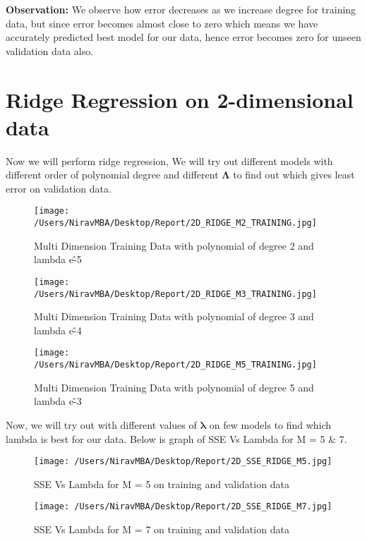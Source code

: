 \documentclass[12pt]{report}
\begin{document}
{\bfseries Observation: } 
We observe how error decreases as we increase degree for training data, but since error becomes almost close to zero which means we have accurately predicted best model for our data, hence error becomes zero for unseen validation data also.



\cleardoublepage

\section{Ridge Regression on 2-dimensional data}


Now we will perform ridge regression, We will try out different models with different order of polynomial degree and different  $ \mathbf{\Lambda} $ to find out which gives least error on validation data.

\begin{figure}[H]
	\centering
	\texttt{[image: /Users/NiravMBA/Desktop/Report/2D\_RIDGE\_M2\_TRAINING.jpg]}
	\caption{Multi Dimension Training Data with polynomial of degree 2 and lambda e\^-5} 
\end{figure}

\begin{figure}[H]
	\centering
	\texttt{[image: /Users/NiravMBA/Desktop/Report/2D\_RIDGE\_M3\_TRAINING.jpg]}
	\caption{Multi Dimension Training Data with polynomial of degree 3 and lambda e\^-4} 
\end{figure}

\begin{figure}[H]
	\centering
	\texttt{[image: /Users/NiravMBA/Desktop/Report/2D\_RIDGE\_M5\_TRAINING.jpg]}
	\caption{Multi Dimension Training Data with polynomial of degree 5 and lambda e\^-3} 
\end{figure}

Now, we will try out with different values of $ \mathbf{\lambda} $ on few models to find which lambda is best for our data. Below is graph of SSE Vs Lambda for M = 5 \& 7.\\

\begin{figure}[H]
	\centering
	\texttt{[image: /Users/NiravMBA/Desktop/Report/2D\_SSE\_RIDGE\_M5.jpg]}
	\caption{SSE Vs Lambda for M = 5 on training and validation data} 
\end{figure}


\begin{figure}[H]
	\centering
	\texttt{[image: /Users/NiravMBA/Desktop/Report/2D\_SSE\_RIDGE\_M7.jpg]}
	\caption{SSE Vs Lambda for M = 7 on training and validation data} 
\end{figure}
\end{document}

